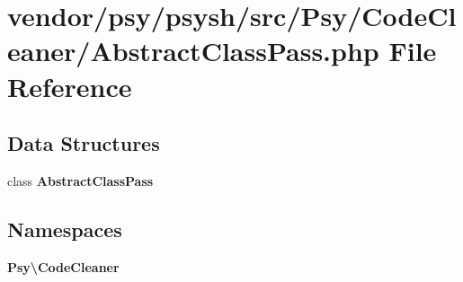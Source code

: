 \section{vendor/psy/psysh/src/\+Psy/\+Code\+Cleaner/\+Abstract\+Class\+Pass.php File Reference}
\label{_abstract_class_pass_8php}
\subsection*{Data Structures}
\begin{DoxyCompactItemize}
\item 
class {\bf Abstract\+Class\+Pass}
\end{DoxyCompactItemize}
\subsection*{Namespaces}
\begin{DoxyCompactItemize}
\item 
 {\bf Psy\textbackslash{}\+Code\+Cleaner}
\end{DoxyCompactItemize}
